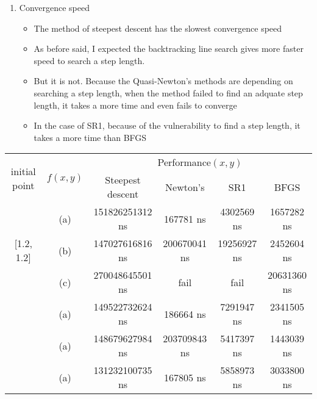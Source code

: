 \documentclass[../main.tex]{subfiles}
\begin{document}
\begin{enumerate}
  \item Convergence speed
  \begin{itemize}
    \item The method of steepest descent has the slowest convergence speed
    \item As before said, I expected the backtracking line search gives more faster speed to search a step length.
    \item But it is not. Because the Quasi-Newton's methods are depending on searching a step length, 
    when the method failed to find an adquate step length, it takes a more time and even fails to converge
    \item In the case of SR1, because of the vulnerability to find a step length, it takes a more time than BFGS
  \end{itemize}
\end{enumerate}
\begin{center}
  \begin{tabular}{| c | c | c | c | c | c | } \hline
  \multirow{2}{*}{initial point} & \multirow{2}{*}{$f(x, y)$}   & \multicolumn{4}{c|}{Performance$(x, y)$} \\ \cline{3-6}
                                  &                              & Steepest descent & Newton's     & SR1         & BFGS \\ \hline
  \multirow{3}{*}{[1.2, 1.2]}     & (a)                          & 151826251312 ns  & 167781 ns    & 4302569 ns  & 1657282 ns  \\ 
                                  & (b)                          & 147027616816 ns  & 200670041 ns & 19256927 ns & 2452604 ns  \\ 
                                  & (c)                          & 270048645501 ns  & fail         & fail        & 20631360 ns \\ \hline
  [5.6,-1.2]                      & (a)                          & 149522732624 ns  & 186664 ns    & 7291947 ns  & 2341505 ns \\ \hline
  [-3.5,2.3]                      & (a)                          & 148679627984 ns  & 203709843 ns & 5417397 ns  & 1443039 ns \\ \hline
  [10.5,-8.3]                     & (a)                          & 131232100735 ns  & 167805 ns    & 5858973 ns  & 3033800 ns \\ \hline
  \end{tabular}
\end{center}
\end{document}

